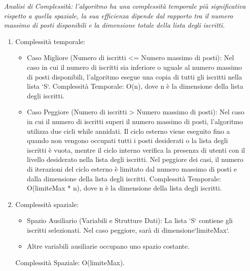 \textit{Analisi di Complessità: l'algoritmo ha una complessità temporale più significativa rispetto a quella spaziale, la sua efficienza dipende dal rapporto tra il numero massimo di posti disponibili e la dimensione totale della lista degli iscritti.}
\begin{enumerate}
	\item Complessità temporale: 
        \begin{itemize}
            \item Caso Migliore (Numero di iscritti <= Numero massimo di posti):
                Nel caso in cui il numero di iscritti sia inferiore o uguale al numero massimo di posti disponibili, l'algoritmo esegue una copia di tutti gli iscritti nella lista `S`.
                Complessità Temporale: O(n), dove n è la dimensione della lista degli iscritti.
            \item Caso Peggiore (Numero di iscritti > Numero massimo di posti):
                Nel caso in cui il numero di iscritti superi il numero massimo di posti, l'algoritmo utilizza due cicli while annidati. Il ciclo esterno viene eseguito fino a quando non vengono occupati tutti i posti desiderati o la lista degli iscritti è vuota, mentre il ciclo interno verifica la presenza di utenti con il livello desiderato nella lista degli iscritti.
                Nel peggiore dei casi, il numero di iterazioni del ciclo esterno è limitato dal numero massimo di posti e dalla dimensione della lista degli iscritti.
                Complessità Temporale: O(limiteMax * n), dove n è la dimensione della lista degli
                iscritti.
        \end{itemize}
	\item Complessità spaziale: 
        \begin{itemize}
            \item Spazio Ausiliario (Variabili e Strutture Dati): La lista `S` contiene gli             iscritti selezionati. Nel caso peggiore, sarà di dimensione`limiteMax`.
            \item Altre variabili ausiliarie occupano uno spazio costante.
        \end{itemize}    
            Complessità Spaziale: O(limiteMax).
\end{enumerate}


